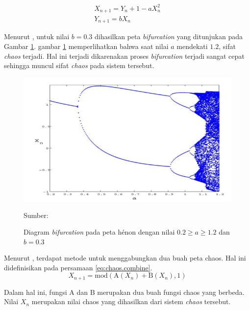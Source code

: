\begin{equation}
  \label{eq:chaos.henon}
  \begin{array}{l}   
  X_{n+1} = Y_{n} + 1 - aX_{n}^2 \\
  Y_{n+1} = bX_{n} 
  \end{array}
\end{equation}

Menurut \textcite{aybar2013}, untuk nilai $b = 0.3$ dihasilkan peta \emph{bifurcation} yang ditunjukan pada Gambar \ref{fig:henon.bifurcation}. gambar \ref{fig:henon.bifurcation} memperlihatkan bahwa saat nilai $a$ mendekati $1.2$, sifat \emph{chaos} terjadi. Hal ini terjadi dikarenakan proses \emph{bifurcation} terjadi sangat cepat sehingga muncul sifat \emph{chaos} pada sistem tersebut.

\begin{figure}[!h]
  \centering
  \includegraphics[width=\textwidth]{chapters/res/chapter-2/img/henon.bifurcation.png}
  \caption{Diagram \emph{bifurcation} pada peta hénon dengan nilai $0.2 \ge a \ge 1.2$ dan $b = 0.3$} \label{fig:henon.bifurcation}
  Sumber: \textcite{aybar2013}
\end{figure}

Menurut \textcite{patel2021}, terdapat metode untuk menggabungkan dua buah peta chaos. Hal ini didefinisikan pada persamaan \ref{eq:chaos.combine}.
\begin{equation}
  \label{eq:chaos.combine}
  X_{n+1} = \text{mod}(\text{A}(X_n) + \text{B}(X_n), 1)
\end{equation}

Dalam hal ini, fungsi $\text{A}$ dan $\text{B}$ merupakan dua buah fungsi chaos yang berbeda. Nilai $X_n$ merupakan nilai chaos yang dihasilkan dari sistem \emph{chaos} tersebut.
  

